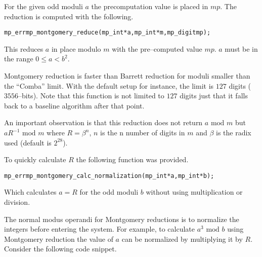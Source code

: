 \documentclass[synpaper]{book}
\begin{document}
For the given odd moduli $a$ the precomputation value is placed in $mp$.  The reduction is computed
with the following.

\begin{alltt}
mp_err mp_montgomery_reduce(mp_int *a, mp_int *m, mp_digit mp);
\end{alltt}
This reduces $a$ in place modulo $m$ with the pre--computed value $mp$.   $a$ must be in the range
$0 \le a < b^2$.

Montgomery reduction is faster than Barrett reduction for moduli smaller than the ``Comba'' limit.
With the default setup for instance, the limit is $127$ digits ($3556$--bits). Note that this
function is not limited to $127$ digits just that it falls back to a baseline algorithm after that
point.

An important observation is that this reduction does not return $a \mbox{ mod }m$ but $aR^{-1}
  \mbox{ mod }m$ where $R = \beta^n$, $n$ is the n number of digits in $m$ and $\beta$ is the radix
used (default is $2^{28}$).

To quickly calculate $R$ the following function was provided.

\begin{alltt}
mp_err mp_montgomery_calc_normalization(mp_int *a, mp_int *b);
\end{alltt}
Which calculates $a = R$ for the odd moduli $b$ without using multiplication or division.

The normal modus operandi for Montgomery reductions is to normalize the integers before entering
the system.  For example, to calculate $a^3 \mbox { mod }b$ using Montgomery reduction the value of
$a$ can be normalized by multiplying it by $R$. Consider the following code snippet.
\end{document}
